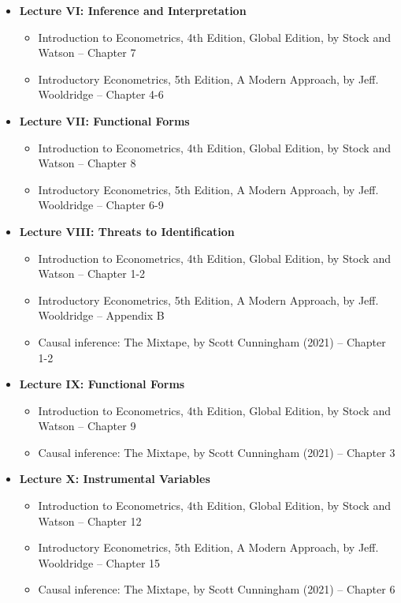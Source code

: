 \documentclass[12pt]{article}
\begin{document}
\begin{itemize}
     \item \textbf{Lecture VI: Inference and Interpretation}
     \begin{itemize}
        \item Introduction to Econometrics, 4th Edition, Global Edition, by Stock and Watson -- Chapter 7
        \item Introductory Econometrics, 5th Edition, A Modern Approach, by Jeff. Wooldridge -- Chapter 4-6
    \end{itemize}

    \item \textbf{Lecture VII: Functional Forms}
    \begin{itemize}
        \item Introduction to Econometrics, 4th Edition, Global Edition, by Stock and Watson -- Chapter 8
        \item Introductory Econometrics, 5th Edition, A Modern Approach, by Jeff. Wooldridge -- Chapter 6-9
    \end{itemize}

    \item \textbf{Lecture VIII: Threats to Identification}
    \begin{itemize}
        \item Introduction to Econometrics, 4th Edition, Global Edition, by Stock and Watson -- Chapter 1-2
        \item Introductory Econometrics, 5th Edition, A Modern Approach, by Jeff. Wooldridge -- Appendix B
        \item  Causal inference: The Mixtape, by Scott Cunningham (2021) -- Chapter 1-2

    \end{itemize}

    \item \textbf{Lecture IX: Functional Forms}
    \begin{itemize}
        \item Introduction to Econometrics, 4th Edition, Global Edition, by Stock and Watson -- Chapter 9
        \item  Causal inference: The Mixtape, by Scott Cunningham (2021) -- Chapter 3

    \end{itemize}

    \item \textbf{Lecture X: Instrumental Variables}
    \begin{itemize}
        \item Introduction to Econometrics, 4th Edition, Global Edition, by Stock and Watson -- Chapter 12
        \item Introductory Econometrics, 5th Edition, A Modern Approach, by Jeff. Wooldridge -- Chapter 15
        \item  Causal inference: The Mixtape, by Scott Cunningham (2021) -- Chapter 6
    \end{itemize}


\end{itemize}
\end{document}
